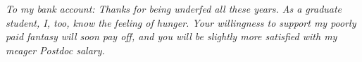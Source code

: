 
\begin{dedication} %

\large\emph{To my bank account: Thanks for being underfed all these years. 
As a graduate student, I, too, know the feeling of hunger. Your willingness 
to support my poorly paid fantasy will soon pay off, and you will be slightly
more satisfied with my meager Postdoc salary.}

\end{dedication}

